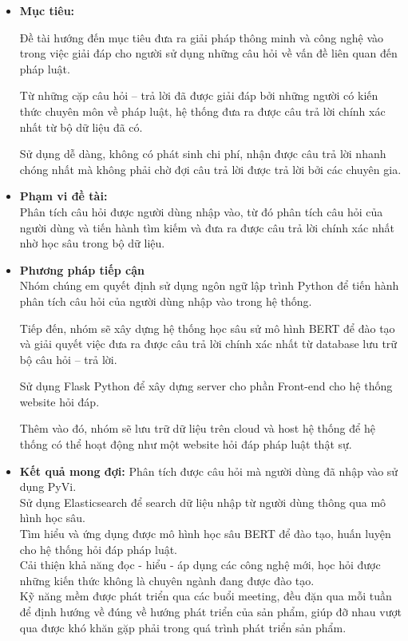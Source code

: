 	\begin{itemize}
		\item[\textbf{1.}] \textbf{ Mục tiêu:}
		
			Đề tài hướng đến mục tiêu đưa ra giải pháp thông minh và công nghệ vào trong việc giải đáp cho người sử dụng những câu hỏi về vấn đề liên 	quan đến pháp luật.
			
			Từ những cặp câu hỏi – trả lời đã được giải đáp bởi những người có kiến thức chuyên môn về pháp luật, hệ thống đưa ra được câu trả lời chính xác nhất từ bộ dữ liệu đã có.
			
			Sử dụng dễ dàng, không có phát sinh chi phí, nhận được câu trả lời nhanh chóng nhất mà không phải chờ đợi câu trả lời được trả lời bởi các chuyên gia.
		\item[\textbf{2.}] \textbf{Phạm vi đề tài:} \\
			Phân tích câu hỏi được người dùng nhập vào, từ đó phân tích câu hỏi của người dùng và tiến hành tìm kiếm và đưa ra được câu trả lời chính xác nhất nhờ học sâu trong bộ dữ liệu.
		\item[\textbf{3.}] \textbf{Phương pháp tiếp cận}\\
			Nhóm chúng em quyết định sử dụng ngôn ngữ lập trình Python để tiến hành phân tích câu hỏi của người dùng nhập vào trong hệ thống.
			
			Tiếp đến, nhóm sẽ xây dựng hệ thống học sâu sử mô hình BERT để đào tạo và giải quyết việc đưa ra được câu trả lời chính xác nhất từ database lưu trữ bộ câu hỏi – trả lời.
			
			Sử dụng Flask Python để xây dựng server cho phần Front-end cho hệ thống website hỏi đáp.
			
			Thêm vào đó, nhóm sẽ lưu trữ dữ liệu trên cloud và host hệ thống để hệ thống có thể hoạt động như một website hỏi đáp pháp luật thật sự.
		\item[\textbf{4.}] \textbf{Kết quả mong đợi:}
			Phân tích được câu hỏi mà người dùng đã nhập vào sử dụng PyVi.\\
			Sử dụng Elasticsearch để search dữ liệu nhập từ người dùng thông qua mô hình học sâu.\\
			Tìm hiểu và ứng dụng được mô hình học sâu BERT để đào tạo, huấn luyện cho hệ thống hỏi đáp pháp luật.\\
			Cải thiện khả năng đọc - hiểu - áp dụng các công nghệ mới, học hỏi được những kiến thức không là chuyên ngành đang được đào tạo.\\
			Kỹ năng mềm được phát triển qua các buổi meeting, đều đặn qua mỗi tuần để định hướng về đúng về hướng phát triển của sản phẩm, giúp đỡ nhau vượt qua được khó khăn gặp phải trong quá trình phát triển sản phẩm.
			
	\end{itemize}
	
